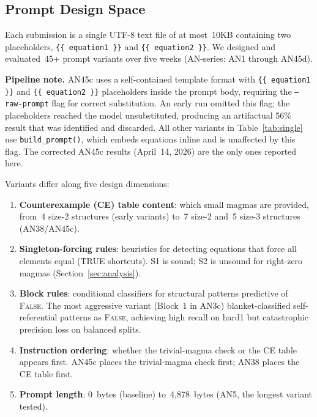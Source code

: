 \documentclass[11pt]{article}
\begin{document}
\subsection{Prompt Design Space}

Each submission is a single UTF-8 text file of at most~10KB containing
two placeholders, \texttt{\{\{ equation1 \}\}} and
\texttt{\{\{ equation2 \}\}}. We designed and evaluated~45+ prompt
variants over five weeks (AN-series: AN1 through AN45d).

\smallskip
\noindent\textbf{Pipeline note.} AN45c uses a self-contained template
format with \texttt{\{\{ equation1 \}\}} and \texttt{\{\{ equation2 \}\}}
placeholders inside the prompt body, requiring the \texttt{--raw-prompt}
flag for correct substitution. An early run omitted this flag; the
placeholders reached the model unsubstituted, producing an artifactual
56\% result that was identified and discarded. All other variants in
Table~\ref{tab:single} use \texttt{build\_prompt()}, which embeds
equations inline and is unaffected by this flag. The corrected AN45c
results (April~14, 2026) are the only ones reported here.
\smallskip

Variants differ along five design dimensions:

\begin{enumerate}
  \item \textbf{Counterexample (CE) table content}: which small magmas
    are provided, from~4 size-2 structures (early variants) to~7
    size-2 and~5 size-3 structures (AN38/AN45c).
  \item \textbf{Singleton-forcing rules}: heuristics for detecting
    equations that force all elements equal (TRUE shortcuts). S1 is
    sound; S2 is unsound for right-zero magmas (Section~\ref{sec:analysis}).
  \item \textbf{Block rules}: conditional classifiers for structural
    patterns predictive of \textsc{False}. The most aggressive variant
    (Block~1 in AN3c) blanket-classified self-referential patterns as
    \textsc{False}, achieving high recall on hard1 but catastrophic
    precision loss on balanced splits.
  \item \textbf{Instruction ordering}: whether the trivial-magma check
    or the CE table appears first. AN45c places the trivial-magma
    check first; AN38 places the CE table first.
  \item \textbf{Prompt length}: 0~bytes (baseline) to~4{,}878~bytes
    (AN5, the longest variant tested).
\end{enumerate}
\end{document}
